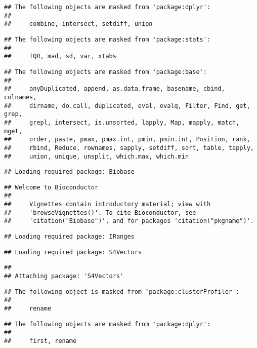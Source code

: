\documentclass[
]{article}
\begin{document}
\begin{verbatim}
## The following objects are masked from 'package:dplyr':
## 
##     combine, intersect, setdiff, union
\end{verbatim}

\begin{verbatim}
## The following objects are masked from 'package:stats':
## 
##     IQR, mad, sd, var, xtabs
\end{verbatim}

\begin{verbatim}
## The following objects are masked from 'package:base':
## 
##     anyDuplicated, append, as.data.frame, basename, cbind, colnames,
##     dirname, do.call, duplicated, eval, evalq, Filter, Find, get, grep,
##     grepl, intersect, is.unsorted, lapply, Map, mapply, match, mget,
##     order, paste, pmax, pmax.int, pmin, pmin.int, Position, rank,
##     rbind, Reduce, rownames, sapply, setdiff, sort, table, tapply,
##     union, unique, unsplit, which.max, which.min
\end{verbatim}

\begin{verbatim}
## Loading required package: Biobase
\end{verbatim}

\begin{verbatim}
## Welcome to Bioconductor
## 
##     Vignettes contain introductory material; view with
##     'browseVignettes()'. To cite Bioconductor, see
##     'citation("Biobase")', and for packages 'citation("pkgname")'.
\end{verbatim}

\begin{verbatim}
## Loading required package: IRanges
\end{verbatim}

\begin{verbatim}
## Loading required package: S4Vectors
\end{verbatim}

\begin{verbatim}
## 
## Attaching package: 'S4Vectors'
\end{verbatim}

\begin{verbatim}
## The following object is masked from 'package:clusterProfiler':
## 
##     rename
\end{verbatim}

\begin{verbatim}
## The following objects are masked from 'package:dplyr':
## 
##     first, rename
\end{verbatim}
\end{document}
